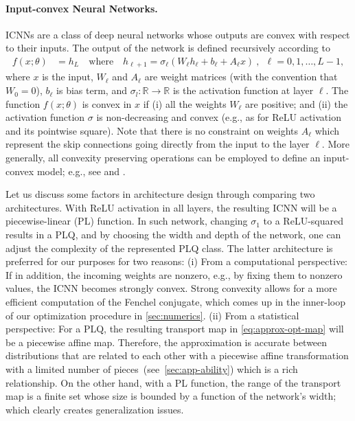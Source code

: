 \documentclass[10pt]{article}
\newcommand{\real}{\mathbb{R}}
\numberwithin{equation}{section}
\begin{document}
\paragraph{Input-convex Neural Networks.} %
ICNNs are a class of deep neural networks whose outputs are convex with respect to their inputs. The output of the network is defined recursively according to
\begin{align*}%
f(x;\theta) &= h_L \quad \text{where}\quad h_{\ell+1} = \sigma_\ell(W_\ell h_\ell + b_\ell + A_\ell x) ~,~~ \ell = 0,1,\ldots, L-1 ,
\end{align*}
where $x$ is the input, $W_\ell$ and $A_\ell$ are weight matrices (with the convention that $W_0=0$), $b_\ell$ is bias term, and $\sigma_l:\real \to \real$ is the activation function at layer $\ell$. The function $f(x;\theta)$ is convex in $x$ if (i) all the weights $W_\ell$ are positive; and (ii) the activation function $\sigma$ is non-decreasing and convex (e.g., as for ReLU activation and its pointwise square). Note that there is no constraint on weights $A_\ell$ which represent the skip connections going directly from the input to the layer $\ell$. More generally, all convexity preserving operations can be employed to define an input-convex model; e.g., see \citet[Section 3.2]{boyd2004convex} and \citet{grant2008cvx}. 

Let us discuss some factors in architecture design through comparing two architectures. With ReLU activation in all layers, the resulting ICNN will be a piecewise-linear (PL) function. In such network, changing $\sigma_1$ to a ReLU-squared results in a PLQ, and by choosing the width and depth of the network, one can adjust the complexity of the represented PLQ class. The latter architecture is preferred for our purposes for two reasons: 
(i) From a computational perspective: If in addition, the incoming weights are nonzero, e.g., by fixing them to nonzero values, the ICNN becomes strongly convex. Strong convexity allows for a more efficient computation of the Fenchel conjugate, which comes up in the inner-loop of our optimization procedure in \autoref{sec:numerics}. 
(ii) From a statistical perspective: For a PLQ, the resulting transport map in \eqref{eq:approx-opt-map} will be a piecewise affine map. Therefore, the approximation is accurate between distributions that are related to each other with a piecewise affine transformation with a limited number of pieces~(see~\autoref{sec:app-ability}) which is a rich relationship. On the other hand, with a PL function, the range of the transport map is a finite set whose size is bounded by a function of the network's width; which clearly creates generalization issues. 
\end{document}
